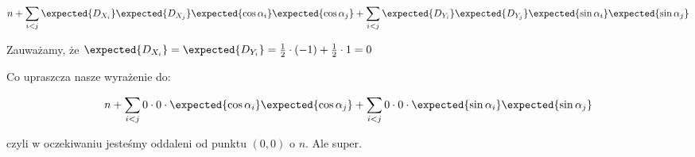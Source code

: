 \[
    n + \sum_{i < j} \expected{D_{X_i}}\expected{D_{X_j}} \expected{ \cos{\alpha_i}} \expected{\cos{\alpha_j}} + 
    {\sum_{i < j} \expected{D_{Y_i}} \expected{D_{Y_j}} \expected{\sin{\alpha_i}} \expected{\sin{\alpha_j}}}
\]

Zauważamy, że \( \expected{D_{X_i}} = \expected{D_{Y_i}} = \frac{1}{2} \cdot (-1) + \frac{1}{2} \cdot 1 = 0\)

Co upraszcza nasze wyrażenie do:

\[
    n + \sum_{i < j} 0 \cdot 0 \cdot \expected{ \cos{\alpha_i}} \expected{\cos{\alpha_j}} + 
    {\sum_{i < j} 0 \cdot 0 \cdot  \expected{\sin{\alpha_i}} \expected{\sin{\alpha_j}}}
\]

czyli w oczekiwaniu jesteśmy oddaleni od punktu \((0, 0)\) o \(n\). Ale super. 